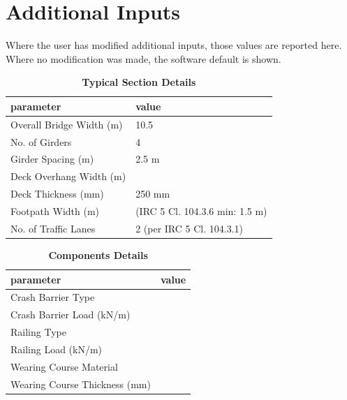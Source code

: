 \documentclass[12pt,a4paper]{report}
\numberwithin{table}{chapter}
\numberwithin{figure}{chapter}
\begin{document}
\newpage
\section{Additional Inputs}
\label{sec:additional-inputs}

Where the user has modified additional inputs, those values are reported here. Where no modification was made, the software default is shown.

\vspace{0.8cm}

\begin{longtable}{|L{5.5cm}|p{10.0cm}|}
\caption{\textbf{Typical Section Details}}
\hline
\textbf{parameter} & \textbf{value} \\
\hline
\textnormal{Overall Bridge Width (m)} & 10.5 \\[6pt]
\hline
\textnormal{No. of Girders} & 4 \\[6pt]
\hline
\textnormal{Girder Spacing (m)} & 2.5 m \\[6pt]
\hline
\textnormal{Deck Overhang Width (m)} &  \\[6pt]
\hline
\textnormal{Deck Thickness (mm)} & 250 mm \\[6pt]
\hline
\textnormal{Footpath Width (m)} &  (IRC 5 Cl. 104.3.6 min: 1.5 m) \\[6pt]
\hline
\textnormal{No. of Traffic Lanes} & 2 (per IRC 5 Cl. 104.3.1) \\[6pt]
\hline
\end{longtable}

\vspace{0.8em}

\begin{longtable}{|L{5.5cm}|p{10.0cm}|}
\caption{\textbf{Components Details}}
\hline
\textbf{parameter} & \textbf{value} \\
\hline
\textnormal{Crash Barrier Type} &  \\[6pt]
\hline
\textnormal{Crash Barrier Load (kN/m)} &  \\[6pt]
\hline

\textnormal{Railing Type} &  \\[6pt]
\hline
\textnormal{Railing Load (kN/m)} &  \\[6pt]
\hline
\textnormal{Wearing Course Material} &  \\[6pt]
\hline
\textnormal{Wearing Course Thickness (mm)} &  \\[6pt]
\hline
\end{longtable}


\newpage
\end{document}
